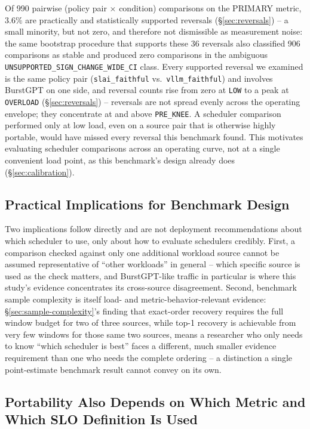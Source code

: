 Of 990 pairwise (policy pair $\times$ condition) comparisons on the
PRIMARY metric, $3.6\%$ are practically and statistically supported
reversals (\S\ref{sec:reversals}) -- a small minority, but not zero, and
therefore not dismissible as measurement noise: the same bootstrap
procedure that supports these 36 reversals also classified 906 comparisons
as stable and produced zero comparisons in the ambiguous
\texttt{UNSUPPORTED\_SIGN\_CHANGE\_WIDE\_CI} class. Every supported
reversal we examined is the same policy pair
(\texttt{slai\_faithful} vs.\ \texttt{vllm\_faithful}) and involves
BurstGPT on one side, and reversal counts rise from zero at \texttt{LOW}
to a peak at \texttt{OVERLOAD} (\S\ref{sec:reversals}) -- reversals are not
spread evenly across the operating envelope; they concentrate at and above
\texttt{PRE\_KNEE}. A scheduler comparison performed only at low load,
even on a source pair that is otherwise highly portable, would have missed
every reversal this benchmark found. This motivates evaluating scheduler
comparisons across an operating curve, not at a single convenient load
point, as this benchmark's design already does
(\S\ref{sec:calibration}).

\subsection{Practical Implications for Benchmark Design}

Two implications follow directly and are not deployment recommendations
about which scheduler to use, only about how to evaluate schedulers
credibly. First, a comparison checked against only one additional workload
source cannot be assumed representative of ``other workloads'' in
general -- which specific source is used as the check matters, and
BurstGPT-like traffic in particular is where this study's evidence
concentrates its cross-source disagreement. Second, benchmark sample
complexity is itself load- and metric-behavior-relevant evidence:
\S\ref{sec:sample-complexity}'s finding that exact-order recovery requires
the full window budget for two of three sources, while top-1 recovery is
achievable from very few windows for those same two sources, means a
researcher who only needs to know ``which scheduler is best'' faces a
different, much smaller evidence requirement than one who needs the
complete ordering -- a distinction a single point-estimate benchmark
result cannot convey on its own.

\subsection{Portability Also Depends on Which Metric and Which SLO
Definition Is Used}

